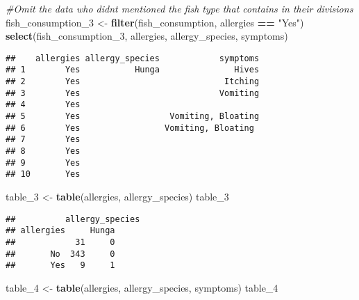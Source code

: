 \documentclass[
]{article}
\newenvironment{Shaded}{\begin{snugshade}}{\end{snugshade}}
\newcommand{\CommentTok}[1]{\textcolor[rgb]{0.56,0.35,0.01}{\textit{#1}}}
\newcommand{\FunctionTok}[1]{\textcolor[rgb]{0.13,0.29,0.53}{\textbf{#1}}}
\newcommand{\NormalTok}[1]{#1}
\newcommand{\OtherTok}[1]{\textcolor[rgb]{0.56,0.35,0.01}{#1}}
\newcommand{\SpecialCharTok}[1]{\textcolor[rgb]{0.81,0.36,0.00}{\textbf{#1}}}
\newcommand{\StringTok}[1]{\textcolor[rgb]{0.31,0.60,0.02}{#1}}
\begin{document}
\begin{Shaded}
\begin{Highlighting}[]
\CommentTok{\#Omit the data who didn\textquotesingle{}t mentioned the fish type that contains in their divisions}
\NormalTok{fish\_consumption\_3 }\OtherTok{\textless{}{-}} \FunctionTok{filter}\NormalTok{(fish\_consumption, allergies }\SpecialCharTok{==} \StringTok{"Yes"}\NormalTok{)}
                    \FunctionTok{select}\NormalTok{(fish\_consumption\_3, allergies, allergy\_species, symptoms)}
\end{Highlighting}
\end{Shaded}

\begin{verbatim}
##    allergies allergy_species            symptoms
## 1        Yes           Hunga               Hives
## 2        Yes                             Itching
## 3        Yes                            Vomiting
## 4        Yes                                    
## 5        Yes                  Vomiting, Bloating
## 6        Yes                 Vomiting, Bloating 
## 7        Yes                                    
## 8        Yes                                    
## 9        Yes                                    
## 10       Yes
\end{verbatim}

\begin{Shaded}
\begin{Highlighting}[]
\NormalTok{table\_3 }\OtherTok{\textless{}{-}} \FunctionTok{table}\NormalTok{(allergies, allergy\_species)}
\NormalTok{table\_3}
\end{Highlighting}
\end{Shaded}

\begin{verbatim}
##          allergy_species
## allergies     Hunga
##            31     0
##       No  343     0
##       Yes   9     1
\end{verbatim}

\begin{Shaded}
\begin{Highlighting}[]
\NormalTok{table\_4 }\OtherTok{\textless{}{-}} \FunctionTok{table}\NormalTok{(allergies, allergy\_species, symptoms)}
\NormalTok{table\_4}
\end{Highlighting}
\end{Shaded}
\end{document}
